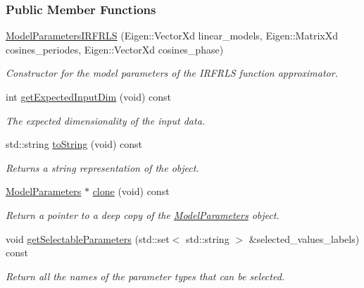 \subsubsection*{Public Member Functions}
\begin{DoxyCompactItemize}
\item 
\hyperlink{classDmpBbo_1_1ModelParametersIRFRLS_a4b946b595de98eabadc9404ed201741f}{Model\+Parameters\+I\+R\+F\+R\+L\+S} (Eigen\+::\+Vector\+Xd linear\+\_\+models, Eigen\+::\+Matrix\+Xd cosines\+\_\+periodes, Eigen\+::\+Vector\+Xd cosines\+\_\+phase)
\begin{DoxyCompactList}\small\item\em Constructor for the model parameters of the I\+R\+F\+R\+L\+S function approximator. \end{DoxyCompactList}\item 
int \hyperlink{classDmpBbo_1_1ModelParametersIRFRLS_af5a550bcf65d5a29a153a594cc4e3fa1}{get\+Expected\+Input\+Dim} (void) const 
\begin{DoxyCompactList}\small\item\em The expected dimensionality of the input data. \end{DoxyCompactList}\item 
std\+::string \hyperlink{classDmpBbo_1_1ModelParametersIRFRLS_a1aca816b42cf0d36118be0ab91120d77}{to\+String} (void) const 
\begin{DoxyCompactList}\small\item\em Returns a string representation of the object. \end{DoxyCompactList}\item 
\hyperlink{classDmpBbo_1_1ModelParameters}{Model\+Parameters} $\ast$ \hyperlink{classDmpBbo_1_1ModelParametersIRFRLS_a0a71d403a2e0560e058c03394648d773}{clone} (void) const 
\begin{DoxyCompactList}\small\item\em Return a pointer to a deep copy of the \hyperlink{classDmpBbo_1_1ModelParameters}{Model\+Parameters} object. \end{DoxyCompactList}\item 
void \hyperlink{classDmpBbo_1_1ModelParametersIRFRLS_a887f4747734bd8b7cc4f799092ff31b4}{get\+Selectable\+Parameters} (std\+::set$<$ std\+::string $>$ \&selected\+\_\+values\+\_\+labels) const 
\begin{DoxyCompactList}\small\item\em Return all the names of the parameter types that can be selected. \end{DoxyCompactList}\item 

\end{DoxyCompactItemize}
